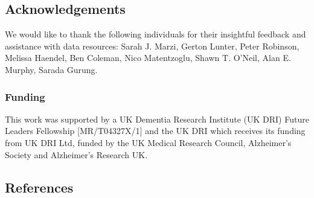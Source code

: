 \documentclass[
sn-nature
]{sn-jnl}
\begin{document}
\subsection{Acknowledgements}\label{acknowledgements}

We would like to thank the following individuals for their insightful
feedback and assistance with data resources: Sarah J. Marzi, Gerton
Lunter, Peter Robinson, Melissa Haendel, Ben Coleman, Nico Matentzoglu,
Shawn T. O'Neil, Alan E. Murphy, Sarada Gurung.

\subsubsection{Funding}\label{funding}

This work was supported by a UK Dementia Research Institute (UK DRI)
Future Leaders Fellowship {[}MR/T04327X/1{]} and the UK DRI which
receives its funding from UK DRI Ltd, funded by the UK Medical Research
Council, Alzheimer's Society and Alzheimer's Research UK.

\subsection*{References}\label{references}
\end{document}
